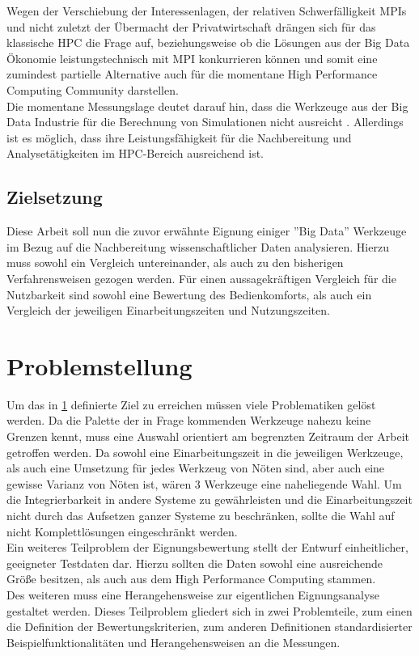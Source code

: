 \documentclass[
	12pt,
	a4paper,
	BCOR10mm,
	DIV14,
	listof=totoc,
	bibliography=totoc,
	headsepline
]{scrreprt}
\begin{document}
Wegen der Verschiebung der Interessenlagen, der relativen Schwerfälligkeit MPIs und nicht zuletzt der Übermacht der Privatwirtschaft drängen sich für das klassische HPC die Frage auf, beziehungsweise ob die Lösungen aus der Big Data Ökonomie leistungstechnisch mit MPI konkurrieren können und somit eine zumindest partielle Alternative auch für die momentane High Performance Computing Community darstellen.\\
Die momentane Messungslage deutet darauf hin, dass die Werkzeuge aus der Big Data Industrie für die Berechnung von Simulationen nicht ausreicht \cite{HLR}.
Allerdings ist es möglich, dass ihre Leistungsfähigkeit für die Nachbereitung und Analysetätigkeiten im HPC-Bereich ausreichend ist. \\

\section{Zielsetzung}
\label{ziel}
Diese Arbeit soll nun die zuvor erwähnte Eignung einiger ''Big Data'' Werkzeuge im Bezug auf die Nachbereitung wissenschaftlicher Daten analysieren.
Hierzu muss sowohl ein Vergleich untereinander, als auch zu den bisherigen Verfahrensweisen gezogen werden.
Für einen aussagekräftigen Vergleich für die Nutzbarkeit sind sowohl eine Bewertung des Bedienkomforts, als auch ein Vergleich der jeweiligen Einarbeitungszeiten und Nutzungszeiten.


\chapter{Problemstellung}
\label{Problemstellung}
Um das in \ref{ziel} definierte Ziel zu erreichen müssen viele Problematiken gelöst werden.
Da die Palette der in Frage kommenden Werkzeuge nahezu keine Grenzen kennt, muss eine Auswahl orientiert am begrenzten Zeitraum der Arbeit getroffen werden.
Da sowohl eine Einarbeitungszeit in die jeweiligen Werkzeuge, als auch eine Umsetzung für jedes Werkzeug von Nöten sind, aber auch eine gewisse Varianz von Nöten ist, wären 3 Werkzeuge eine naheliegende Wahl. 
Um die Integrierbarkeit in andere Systeme zu gewährleisten und die Einarbeitungszeit nicht durch das Aufsetzen ganzer Systeme zu beschränken, sollte die Wahl auf nicht Komplettlösungen eingeschränkt werden. \\
Ein weiteres Teilproblem der Eignungsbewertung stellt der Entwurf einheitlicher, geeigneter Testdaten dar.
Hierzu sollten die Daten sowohl eine ausreichende Größe besitzen, als auch aus dem High Performance Computing stammen. \\
Des weiteren muss eine Herangehensweise zur eigentlichen Eignungsanalyse gestaltet werden. 
Dieses Teilproblem gliedert sich in zwei Problemteile, zum einen die Definition der Bewertungskriterien, zum anderen Definitionen standardisierter Beispielfunktionalitäten und Herangehensweisen an die Messungen.
\end{document}
